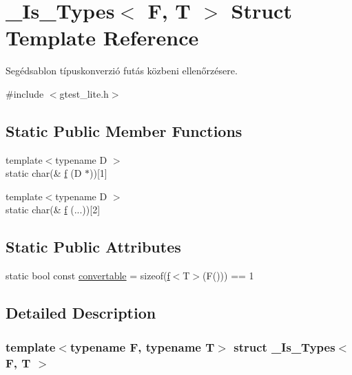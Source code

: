 \hypertarget{struct___is___types}{}\section{\+\_\+\+Is\+\_\+\+Types$<$ F, T $>$ Struct Template Reference}
\label{struct___is___types}


Segédsablon típuskonverzió futás közbeni ellenőrzésere.  




{\ttfamily \#include $<$gtest\+\_\+lite.\+h$>$}

\subsection*{Static Public Member Functions}
\begin{DoxyCompactItemize}
\item 
{\footnotesize template$<$typename D $>$ }\\static char(\& \mbox{\hyperlink{struct___is___types_a1bd22cb90b9438997283201839aec09f}{f}} (D $\ast$))\mbox{[}1\mbox{]}
\item 
{\footnotesize template$<$typename D $>$ }\\static char(\& \mbox{\hyperlink{struct___is___types_a013da65c5a92e9bd02f5d361c10d376d}{f}} (...))\mbox{[}2\mbox{]}
\end{DoxyCompactItemize}
\subsection*{Static Public Attributes}
\begin{DoxyCompactItemize}
\item 
static bool const \mbox{\hyperlink{struct___is___types_aef853f15f013611d0890cb6fc408ae47}{convertable}} = sizeof(\mbox{\hyperlink{struct___is___types_a1bd22cb90b9438997283201839aec09f}{f}}$<$T$>$(F())) == 1
\end{DoxyCompactItemize}


\subsection{Detailed Description}
\subsubsection*{template$<$typename F, typename T$>$\newline
struct \+\_\+\+Is\+\_\+\+Types$<$ F, T $>$}

